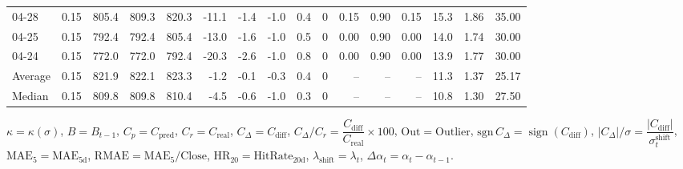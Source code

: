 \begin{threeparttable}
{\begin{tabular}{lrrrrrrrrrrrrrrr}
  04-28 &     0.15 & 805.4 & 809.3 & 820.3 &      -11.1 &           -1.4 &                     -1.0 &                 0.4 &              0 &       0.15 &      0.90 &           0.15 &             15.3 &            1.86 &                  35.00 \\
  04-25 &     0.15 & 792.4 & 792.4 & 805.4 &      -13.0 &           -1.6 &                     -1.0 &                 0.5 &              0 &       0.00 &      0.90 &           0.00 &             14.0 &            1.74 &                  30.00 \\
  04-24 &     0.15 & 772.0 & 772.0 & 792.4 &      -20.3 &           -2.6 &                     -1.0 &                 0.8 &              0 &       0.00 &      0.90 &           0.00 &             13.9 &            1.77 &                  30.00 \\
Average &     0.15 & 821.9 & 822.1 & 823.3 &       -1.2 &           -0.1 &                     -0.3 &                 0.4 &              0 &         -- &        -- &             -- &             11.3 &            1.37 &                  25.17 \\
 Median &     0.15 & 809.8 & 809.8 & 810.4 &       -4.5 &           -0.6 &                     -1.0 &                 0.3 &              0 &         -- &        -- &             -- &             10.8 &            1.30 &                  27.50 \\
\bottomrule
\end{tabular}
}
\begin{tablenotes}\footnotesize
\item $\kappa=\kappa(\sigma)$, $B=B_{t-1}$, $C_p=C_{\text{pred}}$, $C_r=C_{\text{real}}$, $C_\Delta=C_{\text{diff}}$, $C_\Delta/C_r=\dfrac{C_{\text{diff}}}{C_{\text{real}}}\times100$, $\mathrm{Out}=\text{Outlier}$, $\mathrm{sgn}\,C_\Delta=\operatorname{sign}(C_{\text{diff}})$, $|C_\Delta|/\sigma=\dfrac{|C_{\text{diff}}|}{\sigma_t^{\text{shift}}}$, $\mathrm{MAE}_5=\mathrm{MAE}_{5\text{d}}$, $\mathrm{RMAE}= \mathrm{MAE}_5 / \text{Close}$, $\mathrm{HR}_{20}=\mathrm{HitRate}_{20\text{d}}$, 
$\lambda_{\text{shift}}=\lambda_t$, 
$\Delta\alpha_t=\alpha_t-\alpha_{t-1}$.
\end{tablenotes}
\end{threeparttable}
\endgroup

